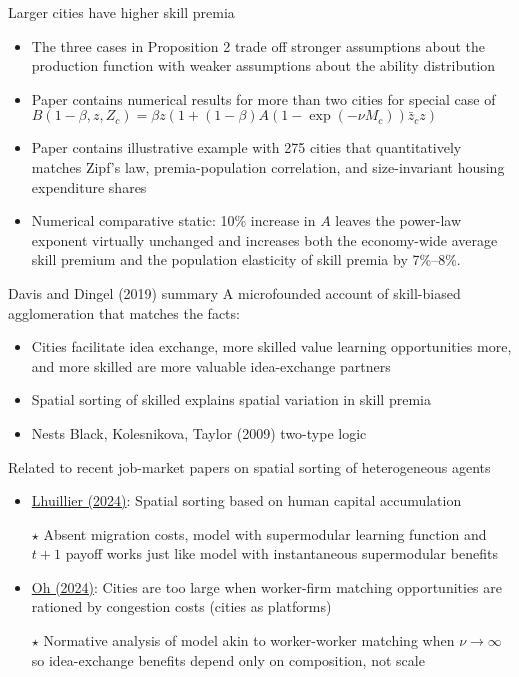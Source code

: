 \documentclass[11pt,notes=hide,aspectratio=169]{beamer}
\begin{document}
\begin{frame}{Larger cities have higher skill premia}
\begin{itemize}
	\item The three cases in Proposition 2 trade off stronger assumptions about the production function with weaker assumptions about the ability distribution
	\item Paper contains numerical results for more than two cities for special case of
	$B(1-\beta,z,Z_c) = {\beta}z(1+(1-\beta)A\left(1-\exp(-\nu M_c) \right) \bar{z}_{c} z)$
	\item Paper contains illustrative example with 275 cities that quantitatively matches Zipf's law, premia-population correlation, and size-invariant housing expenditure shares
\item Numerical comparative static: 10\% increase in $A$ leaves the power-law exponent virtually unchanged and increases both the economy-wide average skill premium and the population elasticity of skill premia by 7\%--8\%.
\end{itemize}
\end{frame}
\begin{frame}{Davis and Dingel (2019) summary}
A microfounded account of skill-biased agglomeration that matches the facts:
\begin{itemize}
\item Cities facilitate idea exchange, 
more skilled value learning opportunities more,
and
more skilled are more valuable idea-exchange partners
\item Spatial sorting of skilled explains spatial variation in skill premia
\item Nests Black, Kolesnikova, Taylor (2009) two-type logic
\end{itemize}
Related to recent job-market papers on spatial sorting of heterogeneous agents
\begin{itemize}
\item \href{https://www.hugolhuillier.com/}{Lhuillier (2024)}:
Spatial sorting based on human capital accumulation
\item[$\star$]
Absent migration costs, model with supermodular learning function and $t+1$ payoff
works just like model with instantaneous supermodular benefits
\item \href{https://sites.google.com/view/ryunghaoh}{Oh (2024)}:
Cities are too large when worker-firm matching opportunities are rationed by congestion costs
(cities as platforms)
\item[$\star$]
Normative analysis of model akin to worker-worker matching when $\nu \to \infty$ so idea-exchange benefits depend only on composition, not scale
\end{itemize}
\end{frame}
\end{document}
